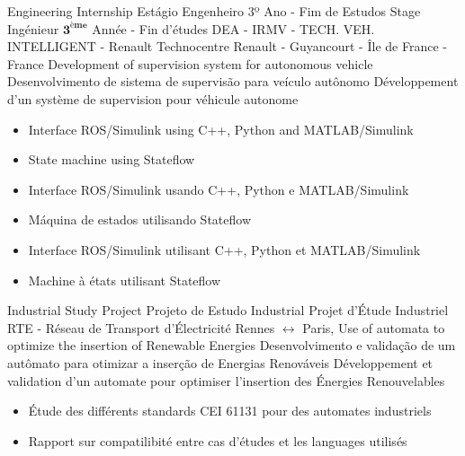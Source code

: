 \cventry{\apr\ 2018 \newline \aug\ 2018\newline}
{
  \ml%
  {Engineering Internship}
  {Estágio Engenheiro 3º Ano - Fim de Estudos}
  {Stage Ingénieur $\mathbf{3^{ème}} $ Année - Fin d'études}}
{\newline DEA - IRMV - TECH. VEH. INTELLIGENT - Renault}
{\newline Technocentre Renault - Guyancourt - Île de France - France}
{\newline
  \ml%
  {Development of supervision system for autonomous vehicle}
  {Desenvolvimento de sistema de supervisão para veículo autônomo}
  {Développement d'un système de supervision pour véhicule autonome}}
{\ml%
  {
    \begin{itemize}
    \item Interface ROS/Simulink using C++, Python and MATLAB/Simulink
    \item State machine using Stateflow
    \end{itemize}
  }
  {
    \begin{itemize}
    \item Interface ROS/Simulink usando C++, Python e MATLAB/Simulink
    \item Máquina de estados utilisando Stateflow
    \end{itemize}
  }
  {
    \begin{itemize}
    \item Interface ROS/Simulink utilisant C++, Python et MATLAB/Simulink
    \item Machine à états utilisant Stateflow
    \end{itemize}
}
}

\cventry{\nov\ 2017 \newline \apr\ 2018\newline}
{
  \ml%
  {Industrial Study Project}
  {Projeto de Estudo Industrial}
  {Projet d'Étude Industriel}}
{\newline RTE - Réseau de Transport d'Électricité}
{\newline Rennes $\leftrightarrow$ Paris,}
{\newline
  \ml%
  {Use of automata to optimize the insertion of Renewable Energies}
  {Desenvolvimento e validação de um autômato para otimizar a inserção
    de Energias Renováveis}
  {Développement et validation d'un automate pour optimiser
    l'insertion des Énergies Renouvelables}}
{
  \begin{itemize}
    \item Étude des différents standards CEI 61131 pour des automates industriels
    \item Rapport sur compatilibité entre cas d'études et les languages utilisés
  \end{itemize}
}


